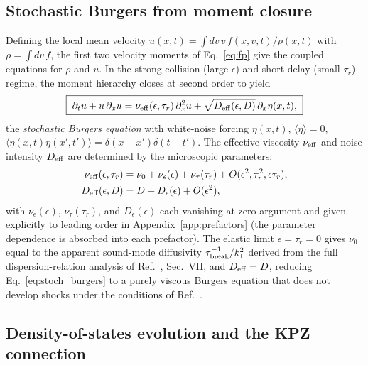 \documentclass[aps,pre,twocolumn,superscriptaddress,longbibliography,floatfix]{revtex4-2}
\begin{document}
\subsection{Stochastic Burgers from moment closure}

Defining the local mean velocity
$u(x,t)=\int dv\,v\,f(x,v,t)/\rho(x,t)$ with
$\rho=\int dv\,f$, the first two velocity moments of
Eq.~\eqref{eq:fp} give the coupled equations for $\rho$ and
$u$. In the strong-collision (large $\epsilon$) and
short-delay (small $\tau_r$) regime, the moment hierarchy
closes at second order to yield
\begin{equation}
\boxed{\;
\partial_t u + u\,\partial_x u =
\nu_{\rm eff}(\epsilon,\tau_r)\,\partial_x^2 u
+ \sqrt{D_{\rm eff}(\epsilon,D)}\,\partial_x \eta(x,t),
\;}
\label{eq:stoch_burgers}
\end{equation}
the \emph{stochastic Burgers equation} with white-noise
forcing $\eta(x,t)$, $\langle\eta\rangle=0$,
$\langle\eta(x,t)\eta(x',t')\rangle=\delta(x-x')\delta(t-t')$.
The effective viscosity $\nu_{\rm eff}$ and noise intensity
$D_{\rm eff}$ are determined by the microscopic parameters:
\begin{align}
\nu_{\rm eff}(\epsilon,\tau_r)
  &= \nu_0 + \nu_\epsilon(\epsilon) + \nu_\tau(\tau_r)
     + O(\epsilon^2,\tau_r^2,\epsilon\tau_r),
     \label{eq:nu_eff}\\
D_{\rm eff}(\epsilon,D)
  &= D + D_\epsilon(\epsilon)
     + O(\epsilon^2),
     \label{eq:D_eff}
\end{align}
with $\nu_\epsilon(\epsilon)$, $\nu_\tau(\tau_r)$, and
$D_\epsilon(\epsilon)$ each vanishing at zero argument
and given explicitly to leading order in
Appendix~\ref{app:prefactors} (the parameter dependence is
absorbed into each prefactor). The elastic limit
$\epsilon=\tau_r=0$ gives $\nu_0$ equal
to the apparent sound-mode diffusivity
$\tau_{\rm break}^{-1}/k_1^2$ derived from the full
dispersion-relation analysis of Ref.~\cite{PaperV},
Sec.~VII, and $D_{\rm eff}=D$, reducing
Eq.~\eqref{eq:stoch_burgers} to a purely viscous Burgers
equation that does not develop shocks under the conditions
of Ref.~\cite{PaperIII}.

\subsection{Density-of-states evolution and the
KPZ connection}
\end{document}
